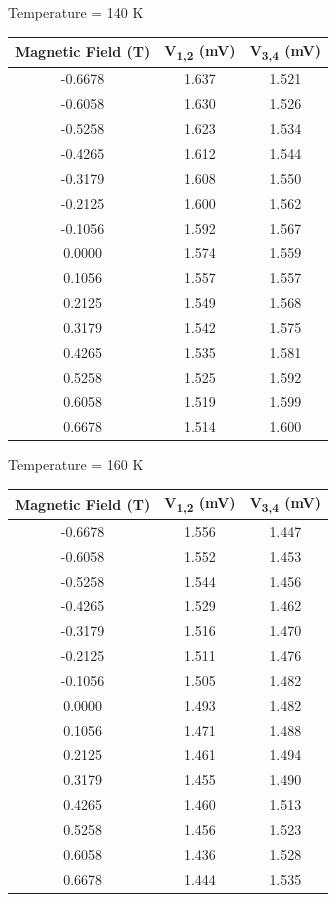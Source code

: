 \documentclass[twocolumn]{article}
\begin{document}
\begin{minipage}{\linewidth}
\Centering
Temperature = 140 K
\begin{tabular}{|c|c|c|}
\hline
Magnetic Field (T) & V\textsubscript{1,2} (mV) & V\textsubscript{3,4} (mV) \\ \hline
-0.6678 & 1.637 & 1.521 \\ \hline
-0.6058 & 1.630 & 1.526 \\ \hline
-0.5258 & 1.623 & 1.534 \\ \hline
-0.4265 & 1.612 & 1.544 \\ \hline
-0.3179 & 1.608 & 1.550 \\ \hline
-0.2125 & 1.600 & 1.562 \\ \hline
-0.1056 & 1.592 & 1.567 \\ \hline
0.0000 & 1.574 & 1.559 \\ \hline
0.1056 & 1.557 & 1.557 \\ \hline
0.2125 & 1.549 & 1.568 \\ \hline
0.3179 & 1.542 & 1.575 \\ \hline
0.4265 & 1.535 & 1.581 \\ \hline
0.5258 & 1.525 & 1.592 \\ \hline
0.6058 & 1.519 & 1.599 \\ \hline
0.6678 & 1.514 & 1.600 \\ \hline
\end{tabular}
\end{minipage}
\begin{minipage}{\linewidth}
\Centering
Temperature = 160 K
\begin{tabular}{|c|c|c|}
\hline
Magnetic Field (T) & V\textsubscript{1,2} (mV) & V\textsubscript{3,4} (mV) \\ \hline
-0.6678 & 1.556 & 1.447 \\ \hline
-0.6058 & 1.552 & 1.453 \\ \hline
-0.5258 & 1.544 & 1.456 \\ \hline
-0.4265 & 1.529 & 1.462 \\ \hline
-0.3179 & 1.516 & 1.470 \\ \hline
-0.2125 & 1.511 & 1.476 \\ \hline
-0.1056 & 1.505 & 1.482 \\ \hline
0.0000 & 1.493 & 1.482 \\ \hline
0.1056 & 1.471 & 1.488 \\ \hline
0.2125 & 1.461 & 1.494 \\ \hline
0.3179 & 1.455 & 1.490 \\ \hline
0.4265 & 1.460 & 1.513 \\ \hline
0.5258 & 1.456 & 1.523 \\ \hline
0.6058 & 1.436 & 1.528 \\ \hline
0.6678 & 1.444 & 1.535 \\ \hline
\end{tabular}
\end{minipage}
\end{document}
